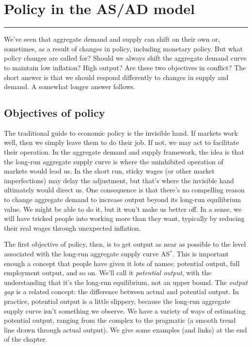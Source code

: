 \chapter{Policy in the AS/AD model 
}\label{chp:pasad}
\hypertarget{asadpolicy}{}


\rule{\textwidth}{1pt}

We've seen that aggregate demand
 and supply can shift on their own or,
sometimes, as a result of changes in policy,
including monetary policy.
But what policy changes are called for?
Should we always shift the aggregate demand
 curve to maintain
low inflation?  High output?
Are these two objectives in conflict?
The short answer is that we should respond differently to changes in supply and demand.
A somewhat longer answer follows.


\section{Objectives of policy}

The traditional guide to economic policy is the invisible hand.
If markets work well, then we simply leave them to do their job.
If not, we may act to facilitate their operation.
In the aggregate demand
 and supply framework,
the idea is that the   long-run aggregate supply 
 curve is where the uninhibited operation of markets would lead us.
In the short run, sticky wages (or other market imperfections)
may delay the adjustment, but that's
where the invisible hand ultimately would direct us.
One consequence is that there's no
compelling reason to change aggregate demand 
to increase output beyond its long-run equilibrium value.
We might be able to do it, but it won't make us better off.
In a sense, we will have tricked people into working more than they
want, typically by reducing their real wages through unexpected inflation.

The first objective of policy, then,
is to get output as near as possible to
the level associated with the long-run
aggregate supply
 curve AS$^*$.
This is important enough a concept that people have given it
lots of names:  potential output, full employment output, and so on.
We'll call it {\it potential output\/}, with the understanding that it's
the long-run equilibrium, not an upper bound.
The {\it output gap \/} is a related concept:
the difference between actual and potential output.
In practice, potential output is a little slippery,
because the   long-run aggregate supply 
 curve isn't something we observe.
We have a variety of ways of estimating potential output,
ranging from the complex  to
the pragmatic (a smooth trend line drawn through actual output).
We give some examples (and links) at the end of the chapter.

